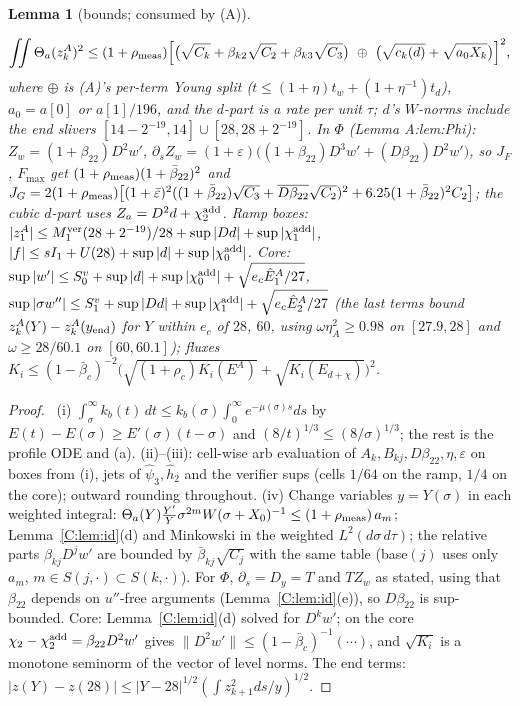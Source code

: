 \documentclass[11pt]{article}
\newtheorem{lemma}{Lemma}
\theoremstyle{remark}\newtheorem{remark}{Remark}
\newcommand{\fn}[1]{\texttt{\detokenize{#1}}}
\begin{document}
\begin{lemma}[bounds; consumed by (A)]
\begin{enumerate}
\[
\iint\Theta_a(z^A_k)^2\le(1+\rho_{\rm meas})\Bigl[\bigl(\sqrt{C_k}+\beta_{k2}\sqrt{C_2}+\beta_{k3}\sqrt{C_3}\bigr)\ \oplus\ \bigl(\sqrt{c_k(d)}+\sqrt{a_0X_k}\bigr)\Bigr]^2 ,
\]
where $\oplus$ is (A)'s per-term Young split ($t\le(1+\eta)t_w+(1+\eta^{-1})t_d$), $a_0=a[0]$ or $a[1]/196$, and the $d$-part is a rate per unit $\tau$; $d$'s $W$-norms include the end slivers $[14-2^{-19},14]\cup[28,28+2^{-19}]$. In $\Phi$ (Lemma A:lem:Phi): $Z_w=(1+\beta_{22})D^2w'$, $\partial_sZ_w=(1+\varepsilon)\bigl((1+\beta_{22})D^3w'+(D\beta_{22})D^2w'\bigr)$, so $J_F$, $F_{\max}$ get $(1+\rho_{\rm meas})(1+\bar\beta_{22})^2$ and $J_G=2(1+\rho_{\rm meas})\bigl[(1+\bar\varepsilon)^2((1+\bar\beta_{22})\sqrt{C_3}+\overline{D\beta_{22}}\sqrt{C_2})^2+6.25(1+\bar\beta_{22})^2C_2\bigr]$; the cubic $d$-part uses $Z_a=D^2d+\chi^{\rm add}_2$. Ramp boxes: $|z^A_1|\le M_1^{\rm ver}(28+2^{-19})/28+\sup|Dd|+\sup|\chi^{\rm add}_1|$, $|f|\le sI_1+U(28)+\sup|d|+\sup|\chi^{\rm add}_0|$. Core: $\sup|w'|\le S^v_0+\sup|d|+\sup|\chi^{\rm add}_0|+\sqrt{e_c\hat E^A_1/27}$, $\sup|\sigma w''|\le S^v_1+\sup|Dd|+\sup|\chi^{\rm add}_1|+\sqrt{e_c\hat E^A_2/27}$ (the last terms bound $z^A_k(Y)-z^A_k(y_{\rm end})$ for $Y$ within $e_c$ of $28$, $60$, using $\omega\eta_A^2\ge0.98$ on $[27.9,28]$ and $\omega\ge28/60.1$ on $[60,60.1]$); fluxes $K_i\le(1-\bar\beta_c)^{-2}\bigl(\sqrt{(1+\rho_c)K_i(E^A)}+\sqrt{K_i(E_{d+\chi})}\bigr)^2$.
\end{enumerate}
\end{lemma}

\begin{proof}\tP\ (i) $\int_\sigma^\infty k_b(t)\,dt\le k_b(\sigma)\int_0^\infty e^{-\mu(\sigma)s}ds$ by $E(t)-E(\sigma)\ge E'(\sigma)(t-\sigma)$ and $(8/t)^{1/3}\le(8/\sigma)^{1/3}$; the rest is the profile ODE and (a). (ii)--(iii): cell-wise arb evaluation of $A_k,B_{kj},D\beta_{22},\eta,\varepsilon$ on boxes from (i), \fn{c4fun} jets of $\hat\psi_3,\hat h_2$ and the verifier sups (cells $1/64$ on the ramp, $1/4$ on the core); outward rounding throughout. (iv) Change variables $y=Y(\sigma)$ in each weighted integral: $\Theta_a(Y)\frac{Y'}{Y}\sigma^{2m}W(\sigma+X_0)^{-1}\le(1+\rho_{\rm meas})\,a_m$; Lemma~\ref{C:lem:id}(d) and Minkowski in the weighted $L^2(d\sigma\,d\tau)$; the relative parts $\beta_{kj}D^jw'$ are bounded by $\bar\beta_{kj}\sqrt{C_j}$ with the same table (base$(j)$ uses only $a_m$, $m\in S(j,\cdot)\subset S(k,\cdot)$). For $\Phi$, $\partial_s=D_y=T$ and $T Z_w$ as stated, using that $\beta_{22}$ depends on $u''$-free arguments (Lemma~\ref{C:lem:id}(e)), so $D\beta_{22}$ is sup-bounded. Core: Lemma~\ref{C:lem:id}(d) solved for $D^kw'$; on the core $\chi_2-\chi_2^{\rm add}=\beta_{22}D^2w'$ gives $\|D^2w'\|\le(1-\bar\beta_c)^{-1}(\cdots)$, and $\sqrt{K_i}$ is a monotone seminorm of the vector of level norms. The end terms: $|z(Y)-z(28)|\le|Y-28|^{1/2}(\int z_{k+1}^2ds/y)^{1/2}$.
\end{proof}
\end{document}
